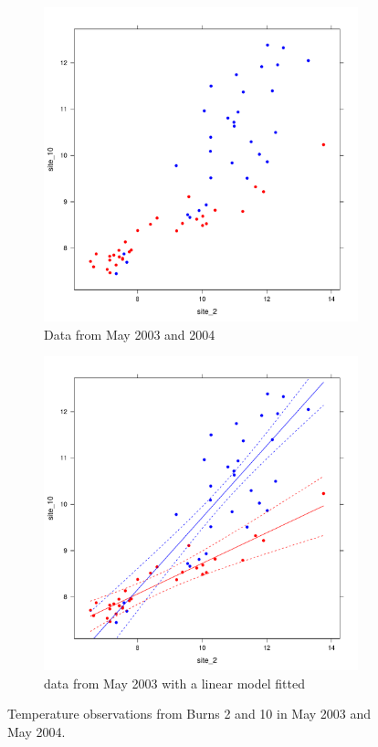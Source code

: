 \begin{figure}
\centering
  \begin{subfigure}[b]{0.45\textwidth}
    \centering
    \includegraphics[width=\textwidth]{simpleExample2plot-1}
    \caption{Data from May 2003 and 2004}
    \label{fig:chptr4:simpleplot2a}
  \end{subfigure}
  \hfill
  \begin{subfigure}[b]{0.45\textwidth}
    \centering
    \includegraphics[width=\textwidth]{simpleExample2plot-2}
    \caption{data from May 2003 with a linear model fitted}
    \label{fig:chptr4:simpleplot2b}
  \end{subfigure}
\caption{Temperature observations from Burns 2 and 10 in May 2003 and May 2004.}
\label{fig:chptr4:simpleplot2}
\end{figure}
